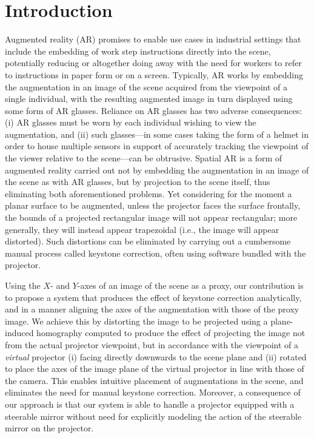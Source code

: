 \documentclass[review]{elsarticle}
\begin{document}
\linenumbers

\section{Introduction}\label{sec:intro}

Augmented reality (AR) promises to enable use cases in industrial settings that include the embedding of work step instructions directly into the scene, potentially reducing or altogether doing away with the need for workers to refer to instructions in paper form or on a screen. Typically, AR works by embedding the augmentation in an image of the scene acquired from the viewpoint of a single individual, with the resulting augmented image in turn displayed using some form of AR glasses. Reliance on AR glasses has two adverse consequences: (i) AR glasses must be worn by each individual wishing to view the augmentation, and (ii) such glasses---in some cases taking the form of a helmet in order to house multiple sensors in support of accurately tracking the viewpoint of the viewer relative to the scene---can be obtrusive. Spatial AR is a form of augmented reality carried out not by embedding the augmentation in an image of the scene as with AR glasses, but by projection to the scene itself, thus eliminating both aforementioned problems. Yet considering for the moment a planar surface to be augmented, unless the projector faces the surface frontally, the bounds of a projected rectangular image will not appear rectangular; more generally, they will instead appear trapezoidal (i.e., the image will appear distorted). Such distortions can be eliminated by carrying out a cumbersome manual process called keystone correction, often using software bundled with the projector.

Using the $X$- and $Y$-axes of an image of the scene as a proxy, our contribution is to propose a system that produces the effect of keystone correction analytically, and in a manner aligning the axes of the augmentation with those of the proxy image. We achieve this by distorting the image to be projected using a plane-induced homography computed to produce the effect of projecting the image not from the actual projector viewpoint, but in accordance with the viewpoint of a \textit{virtual} projector (i) facing directly downwards to the scene plane and (ii) rotated to place the axes of the image plane of the virtual projector in line with those of the camera. This enables intuitive placement of augmentations in the scene, and eliminates the need for manual keystone correction. Moreover, a consequence of our approach is that our system is able to handle a projector equipped with a steerable mirror without need for explicitly modeling the action of the steerable mirror on the projector.
\end{document}
